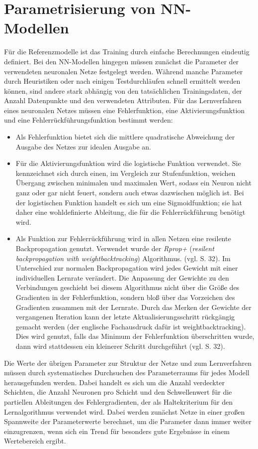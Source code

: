 \documentclass[
	twoside,
	12pt,
	a4paper,
	BCOR10mm,
	DIV14,
	listof=totoc,
	bibliography=totoc,
	headsepline
]{scrreprt}
\begin{document}
\section{Parametrisierung von NN-Modellen}
\label{parametrisierung}
Für die Referenzmodelle ist das Training durch einfache Berechnungen eindeutig definiert.
Bei den NN-Modellen hingegen müssen zunächst die Parameter der verwendeten neuronalen Netze festgelegt werden. 
Während manche Parameter durch Heuristiken oder nach einigen Testdurchläufen schnell ermittelt werden können, sind andere stark abhängig von den tatsächlichen Trainingsdaten, der Anzahl Datenpunkte und den verwendeten Attributen. Für das Lernverfahren eines neuronalen Netzes müssen eine Fehlerfunktion, eine Aktivierungsfunktion und eine Fehlerrückführungsfunktion bestimmt werden: 
\begin{itemize}
\item Als Fehlerfunktion bietet sich die mittlere quadratische Abweichung der Ausgabe des Netzes zur idealen Ausgabe an.
\item Für die Aktivierungsfunktion wird die logistische Funktion verwendet. Sie kennzeichnet sich durch einen, im Vergleich zur Stufenfunktion, weichen Übergang zwischen minimalen und maximalen Wert, sodass ein Neuron nicht ganz oder gar nicht feuert, sondern auch etwas dazwischen möglich ist. Bei der logistischen Funktion handelt es sich um eine Sigmoidfunktion; sie hat daher eine wohldefinierte Ableitung, die für die Fehlerrückführung benötigt wird. 
\item Als Funktion zur Fehlerrückführung wird in allen Netzen eine resilente Backpropagation genutzt. Verwendet wurde der \textit{Rprop+} (\textit{resilent backpropagation with weightbacktracking}) Algorithmus.  (vgl. \cite{gunther2010neuralnet} S. 32).
Im Unterschied zur normalen Backpropagation wird jedes Gewicht mit einer individuellen Lernrate verändert. Die Anpassung der Gewichte zu den Verbindungen geschieht bei diesem Algorithmus nicht über die Größe des Gradienten in der Fehlerfunktion, sondern bloß über das Vorzeichen des Gradienten zusammen mit der Lernrate.
Durch das Merken der Gewichte der vergangenen Iteration kann der letzte Aktualisierungsschritt rückgängig gemacht werden (der englische Fachausdruck dafür ist weightbacktracking). Dies wird genutzt, falls das Minimum der Fehlerfunktion überschritten wurde, dann wird stattdessen ein kleinerer Schritt durchgeführt (vgl. \cite{gunther2010neuralnet} S. 32).
\end{itemize}
Die Werte der übrigen Parameter zur Struktur der Netze und zum Lernverfahren müssen durch systematisches Durchsuchen des Parameterraums für jedes Modell herausgefunden werden. Dabei handelt es sich um die Anzahl verdeckter Schichten, die Anzahl Neuronen pro Schicht und den Schwellenwert für die partiellen Ableitungen des Fehlergradienten, der als Haltekriterium für den Lernalgorithmus verwendet wird.
Dabei werden zunächst Netze in einer großen Spannweite der Parameterwerte berechnet, um die Parameter dann immer weiter einzugrenzen, wenn sich ein Trend für besonders gute Ergebnisse in einem Wertebereich ergibt.
\end{document}
